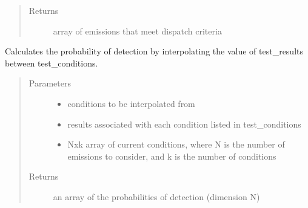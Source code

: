\documentclass[letterpaper,10pt,english]{sphinxmanual}
\begin{document}
\begin{fulllineitems}
\begin{fulllineitems}
\begin{quote}
\begin{description}
\begin{itemize}
\end{itemize}

\item[{Returns}] \leavevmode
array of emissions that meet dispatch criteria

\end{description}\end{quote}

\end{fulllineitems}


\begin{fulllineitems}
\label{\detokenize{index:feast.DetectionModules.abstract_detection_method.DetectionMethod.empirical_interpolator}}
Calculates the probability of detection by interpolating the value of test\_results between test\_conditions.
\begin{quote}\begin{description}
\item[{Parameters}] \leavevmode\begin{itemize}
\item {} 
 \textendash{} conditions to be interpolated from

\item {} 
 \textendash{} results associated with each condition listed in test\_conditions

\item {} 
 \textendash{} Nxk array of current conditions, where N is the number of emissions to consider,
and k is the number of conditions

\end{itemize}

\item[{Returns}] \leavevmode
an array of the probabilities of detection (dimension N)

\end{description}\end{quote}

\end{fulllineitems}


\end{fulllineitems}
\end{document}
